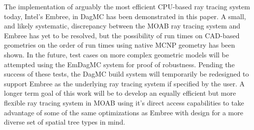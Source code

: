 \documentclass{anstrans}
\begin{document}
The implementation of arguably the most efficient CPU-based ray tracing system today, Intel's Embree, in DagMC has been demonstrated in this paper. A small, and likely systematic, discrepancy between the MOAB ray tracing system and Embree has yet to be resolved, but the possibility of run times on CAD-based geometries on the order of run times using native MCNP geometry has been shown.
In the future, test cases on more complex geometric models will be attempted using the EmDagMC system for proof of robustness. Pending the success of these tests, the DagMC build system will temporarily be redesigned to support Embree as the underlying ray tracing system if specified by the user. A longer term goal of this work will be to develop an equally efficient but more flexible ray tracing system in MOAB using it's direct access capabilities \cite{moab} to take advantage of some of the same optimizations as Embree with design for a more diverse set of spatial tree types in mind. 



\end{document}
